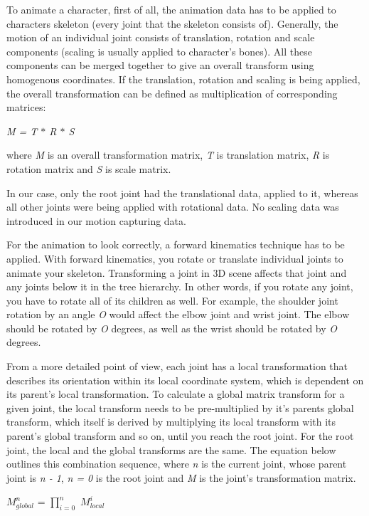 \documentclass[times, 10pt,twocolumn]{article}
\begin{document}
To animate a character, first of all, the animation data has to be applied to characters skeleton (every joint that the skeleton consists of). Generally, the motion of an individual joint consists of translation, rotation and scale components (scaling is usually applied to character's bones). All these components can be merged together to give an overall transform using homogenous coordinates.  If the translation, rotation and scaling is being applied, the overall transformation can be defined as multiplication of corresponding matrices:

\begin{center}
\emph{M = T $\ast$ R $\ast$ S}
\end{center}
where \emph{M} is an overall transformation matrix, \emph{T} is translation matrix, \emph{R} is rotation matrix and \emph{S} is scale matrix.

In our case, only the root joint had the translational data, applied to it, whereas all other joints were being applied with rotational data. No scaling data was introduced in our motion capturing data.

For the animation to look correctly, a forward kinematics technique has to be applied. With forward kinematics, you rotate or translate individual joints to  animate your skeleton. Transforming a joint in 3D scene affects that joint and any joints below it in the tree hierarchy. In other words, if you rotate any joint, you have to rotate all of its children as well. For example, the shoulder joint rotation by an angle \emph{O} would affect the elbow joint and wrist joint. The elbow should be rotated by \emph{O} degrees, as well as the wrist should be rotated by \emph{O} degrees.  

From a more detailed point of view, each joint has a local transformation that describes its orientation within its local coordinate system, which is dependent on its parent's local transformation. To calculate a global matrix transform for a given joint, the local transform needs to be pre-multiplied by it's parents global transform, which itself is  derived by multiplying its local transform with its parent's global transform and so on, until you reach the root joint. For the root joint, the local and the global transforms are the same. The equation below outlines this combination sequence, where \emph{n} is the current joint, whose parent joint is \emph{n - 1}, \emph{n = 0} is the root joint and \emph{M} is the joint's transformation matrix.

\begin{center}
$M^{n}_{global}$ = $\prod^{n}_{i = 0}$ $M^{i}_{local}$
\end{center}
\end{document}

